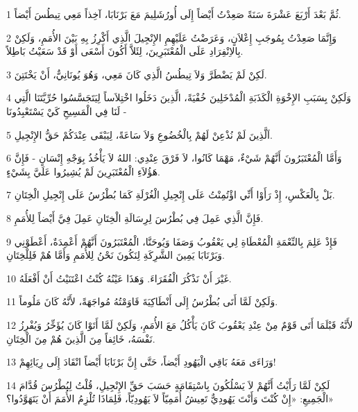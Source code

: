 \par 1 ثُمَّ بَعْدَ أَرْبَعَ عَشْرَةَ سَنَةً صَعِدْتُ أَيْضاً إِلَى أُورُشَلِيمَ مَعَ بَرْنَابَا، آخِذاً مَعِي تِيطُسَ أَيْضاً.
\par 2 وَإِنَّمَا صَعِدْتُ بِمُوجَبِ إِعْلاَنٍ، وَعَرَضْتُ عَلَيْهِمِ الإِنْجِيلَ الَّذِي أَكْرِزُ بِهِ بَيْنَ الأُمَمِ، وَلَكِنْ بِالاِنْفِرَادِ عَلَى الْمُعْتَبَرِينَ، لِئَلاَّ أَكُونَ أَسْعَى أَوْ قَدْ سَعَيْتُ بَاطِلاً.
\par 3 لَكِنْ لَمْ يَضْطَرَّ وَلاَ تِيطُسُ الَّذِي كَانَ مَعِي، وَهُوَ يُونَانِيٌّ، أَنْ يَخْتَتِنَ.
\par 4 وَلَكِنْ بِسَبَبِ الإِخْوَةِ الْكَذَبَةِ الْمُدْخَلِينَ خُفْيَةً، الَّذِينَ دَخَلُوا اخْتِلاَساً لِيَتَجَسَّسُوا حُرِّيَّتَنَا الَّتِي لَنَا فِي الْمَسِيحِ كَيْ يَسْتَعْبِدُونَا -
\par 5 اَلَّذِينَ لَمْ نُذْعِنْ لَهُمْ بِالْخُضُوعِ وَلاَ سَاعَةً، لِيَبْقَى عِنْدَكُمْ حَقُّ الإِنْجِيلِ.
\par 6 وَأَمَّا الْمُعْتَبَرُونَ أَنَّهُمْ شَيْءٌ، مَهْمَا كَانُوا، لاَ فَرْقَ عِنْدِي: اللهُ لاَ يَأْخُذُ بِوَجْهِ إِنْسَانٍ - فَإِنَّ هَؤُلاَءِ الْمُعْتَبَرِينَ لَمْ يُشِيرُوا عَلَيَّ بِشَيْءٍ.
\par 7 بَلْ بِالْعَكْسِ، إِذْ رَأَوْا أَنِّي اؤْتُمِنْتُ عَلَى إِنْجِيلِ الْغُرْلَةِ كَمَا بُطْرُسُ عَلَى إِنْجِيلِ الْخِتَانِ.
\par 8 فَإِنَّ الَّذِي عَمِلَ فِي بُطْرُسَ لِرِسَالَةِ الْخِتَانِ عَمِلَ فِيَّ أَيْضاً لِلأُمَمِ.
\par 9 فَإِذْ عَلِمَ بِالنِّعْمَةِ الْمُعْطَاةِ لِي يَعْقُوبُ وَصَفَا وَيُوحَنَّا، الْمُعْتَبَرُونَ أَنَّهُمْ أَعْمِدَةٌ، أَعْطَوْنِي وَبَرْنَابَا يَمِينَ الشَّرِكَةِ لِنَكُونَ نَحْنُ لِلأُمَمِ وَأَمَّا هُمْ فَلِلْخِتَانِ.
\par 10 غَيْرَ أَنْ نَذْكُرَ الْفُقَرَاءَ. وَهَذَا عَيْنُهُ كُنْتُ اعْتَنَيْتُ أَنْ أَفْعَلَهُ.
\par 11 وَلَكِنْ لَمَّا أَتَى بُطْرُسُ إِلَى أَنْطَاكِيَةَ قَاوَمْتُهُ مُواجَهَةً، لأَنَّهُ كَانَ مَلُوماً.
\par 12 لأَنَّهُ قَبْلَمَا أَتَى قَوْمٌ مِنْ عِنْدِ يَعْقُوبَ كَانَ يَأْكُلُ مَعَ الأُمَمِ، وَلَكِنْ لَمَّا أَتَوْا كَانَ يُؤَخِّرُ وَيُفْرِزُ نَفْسَهُ، خَائِفاً مِنَ الَّذِينَ هُمْ مِنَ الْخِتَانِ.
\par 13 وَرَاءَى مَعَهُ بَاقِي الْيَهُودِ أَيْضاً، حَتَّى إِنَّ بَرْنَابَا أَيْضاً انْقَادَ إِلَى رِيَائِهِمْ!
\par 14 لَكِنْ لَمَّا رَأَيْتُ أَنَّهُمْ لاَ يَسْلُكُونَ بِاسْتِقَامَةٍ حَسَبَ حَقِّ الإِنْجِيلِ، قُلْتُ لِبُطْرُسَ قُدَّامَ الْجَمِيعِ: «إِنْ كُنْتَ وَأَنْتَ يَهُودِيٌّ تَعِيشُ أُمَمِيّاً لاَ يَهُودِيّاً، فَلِمَاذَا تُلْزِمُ الأُمَمَ أَنْ يَتَهَوَّدُوا؟»
